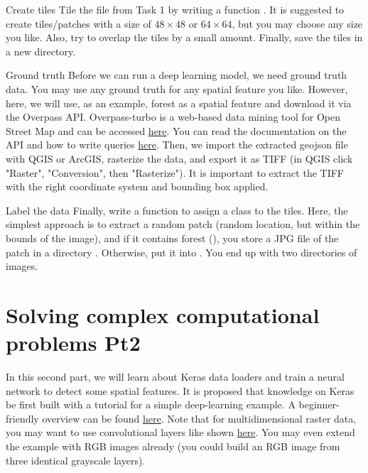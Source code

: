 \documentclass[twoside]{article}
\begin{document}
\begin{task}{Create tiles}{}{}
Tile the file  from Task 1 by writing a function .
It is suggested to create tiles/patches with a size of $48 \times 48$ or $64 \times 64$, but you may choose any size you like.
Also, try to overlap the tiles by a small amount.
Finally, save the tiles in a new directory.

\end{task}

\begin{task}{Ground truth}{}{}
Before we can run a deep learning model, we need ground truth data.
You may use any ground truth for any spatial feature you like.
However, here, we will use, as an example, forest as a spatial feature and download it via the Overpass API.
Overpass-turbo is a web-based data mining tool for Open Street Map and can be accessed \href{https://overpass-turbo.eu/}{here}.
You can read the documentation on the API and how to write queries \href{https://wiki.openstreetmap.org/wiki/Overpass_API/Overpass_QL}{here}.
Then, we import the extracted geojson file with QGIS or ArcGIS, rasterize the data, and export it as TIFF (in QGIS click "Raster", "Conversion", then "Rasterize").
It is important to extract the TIFF with the right coordinate system and bounding box applied.

\end{task}


\begin{task}{Label the data}{}{}
Finally, write a function  to assign a class to the tiles.
Here, the simplest approach is to extract a random patch (random location, but within the bounds of the image), and if it contains forest (), you store a JPG file of the patch in a directory . Otherwise, put it into .
You end up with two directories of images.

\end{task}

\clearpage
\section{Solving complex computational problems Pt2}
In this second part, we will learn about Keras data loaders and train a neural network to detect some spatial features.
It is proposed that knowledge on Keras be first built with a tutorial for a simple deep-learning example. 
A beginner-friendly overview can be found \href{https://www.tensorflow.org/tutorials/keras/classification}{here}.
Note that for multidimensional raster data, you may want to use convolutional layers like shown \href{https://keras.io/examples/vision/mnist_convnet/}{here}.
You may even extend the example with RGB images already (you could build an RGB image from three identical grayscale layers).
\end{document}
